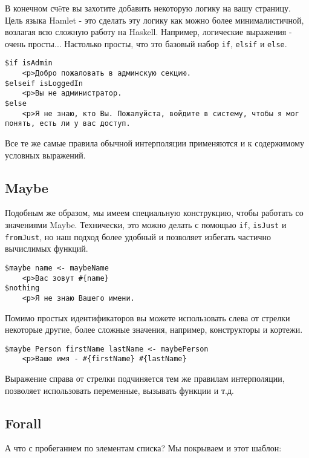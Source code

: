 В конечном счëте вы захотите добавить некоторую логику на вашу страницу. Цель
языка Hamlet - это сделать эту логику как можно более минималистичной, возлагая
всю сложную работу на Haskell. Например, логические выражения - очень просты...
Настолько просты, что это базовый набор \texttt{if}, \texttt{elsif} и 
\texttt{else}.

\begin{lstlisting}
$if isAdmin
    <p>Добро пожаловать в админскую секцию.
$elseif isLoggedIn
    <p>Вы не администратор.
$else
    <p>Я не знаю, кто Вы. Пожалуйста, войдите в систему, чтобы я мог понять, есть ли у вас доступ.
\end{lstlisting}

Все те же самые правила обычной интерполяции применяются и к содержимому 
условных выражений.

\subsection{Maybe}

Подобным же образом, мы имеем специальную конструкцию, чтобы работать 
со значениями Maybe. Технически, это можно делать с помощью \texttt{if}, 
\texttt{isJust} и \texttt{fromJust}, но наш подход более удобный и позволяет
избегать частично вычислимых функций.

\begin{lstlisting}
$maybe name <- maybeName
    <p>Ваc зовут #{name}
$nothing
    <p>Я не знаю Вашего имени.
\end{lstlisting}

Помимо простых идентификаторов вы можете использовать слева от стрелки некоторые другие, 
более сложные значения, например, конструкторы и кортежи.

\begin{lstlisting}
$maybe Person firstName lastName <- maybePerson
    <p>Ваше имя - #{firstName} #{lastName}
\end{lstlisting}

Выражение справа от стрелки подчиняется тем же правилам интерполяции, 
позволяет использовать переменные, вызывать функции и т.д.

\subsection{Forall}

А что с пробеганием по элементам списка? Мы покрываем и этот шаблон:

